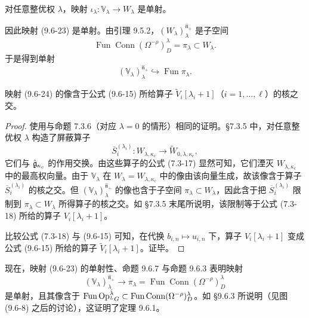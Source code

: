 \begin{theorem}
    对任意整优权 $\lambda$，映射 $\iota_\lambda:\mathbb{V}_\lambda\to W_\lambda$ 是单射。
\end{theorem}

因此映射 (9.6-23) 是单射。由引理 9.5.2，$(W_\lambda)^{\hat{\mathfrak{n}}_+}_\lambda$ 是子空间
\[
    \operatorname{Fun}\operatorname{Conn}(\Omega^{-\rho})^\lambda_D=\pi_\lambda\subset W_\lambda .
\]
于是得到单射
\begin{equation}
    (\mathbb{V}_\lambda)^{\hat{\mathfrak{n}}_+}_\lambda\hookrightarrow\operatorname{Fun}\pi_\lambda .
    \tag{9.6-24}
\end{equation}

\begin{proposition}
    映射 (9.6-24) 的像含于公式 (9.6-15) 所给算子 $\widetilde{V}_i[\lambda_i+1]$（$i=1,\dots,\ell$）的核之交。
\end{proposition}

\begin{proof}
    使用与命题 7.3.6（对应 $\lambda=0$ 的情形）相同的证明。§7.3.5 中，对任意整优权 $\lambda$ 构造了屏蔽算子
    \[
        \overline{S}^{(\lambda_i)}_i:W_{\lambda,\kappa_c}\to\widetilde{W}_{0,\lambda,\kappa_c},
    \]
    它们与 $\hat{\mathfrak{g}}_{\kappa_c}$ 的作用交换。由这些算子的公式 (7.3-17) 显然可知，它们湮灭 $W_{\lambda,\kappa_c}$ 中的最高权向量。由于 $\mathbb{V}_\lambda$ 在 $W_\lambda=W_{\lambda,\kappa_c}$ 中的像由该向量生成，故该像含于算子 $\overline{S}^{(\lambda_i)}_i$ 的核之交。但 $(\mathbb{V}_\lambda)^{\hat{\mathfrak{n}}_+}_\lambda$ 的像也含于子空间 $\pi_\lambda\subset W_\lambda$，因此含于把 $\overline{S}^{(\lambda_i)}_i$ 限制到 $\pi_\lambda\subset W_\lambda$ 所得算子的核之交。如 §7.3.5 末尾所说明，该限制等于公式 (7.3-18) 所给的算子 $V_i[\lambda_i+1]$。

    比较公式 (7.3-18) 与 (9.6-15) 可知，在代换 $b_{i,n}\mapsto u_{i,n}$ 下，算子 $V_i[\lambda_i+1]$ 变成公式 (9.6-15) 所给的算子 $\widetilde{V}_i[\lambda_i+1]$。证毕。
\end{proof}

现在，映射 (9.6-23) 的单射性、命题 9.6.7 与命题 9.6.3 表明映射
\[
    (\mathbb{V}_\lambda)^{\hat{\mathfrak{n}}_+}_\lambda\to\pi_\lambda
    =\operatorname{Fun}\operatorname{Conn}(\Omega^{-\rho})^\lambda_D
\]
是单射，且其像含于 $\operatorname{Fun}\operatorname{Op}^{\check\lambda}_{{}^LG}\subset\operatorname{Fun}\operatorname{Conn}(\Omega^{-\rho})^\lambda_D$。如 §9.6.3 所说明（见图 (9.6-8) 之后的讨论），这证明了定理 9.6.1。






